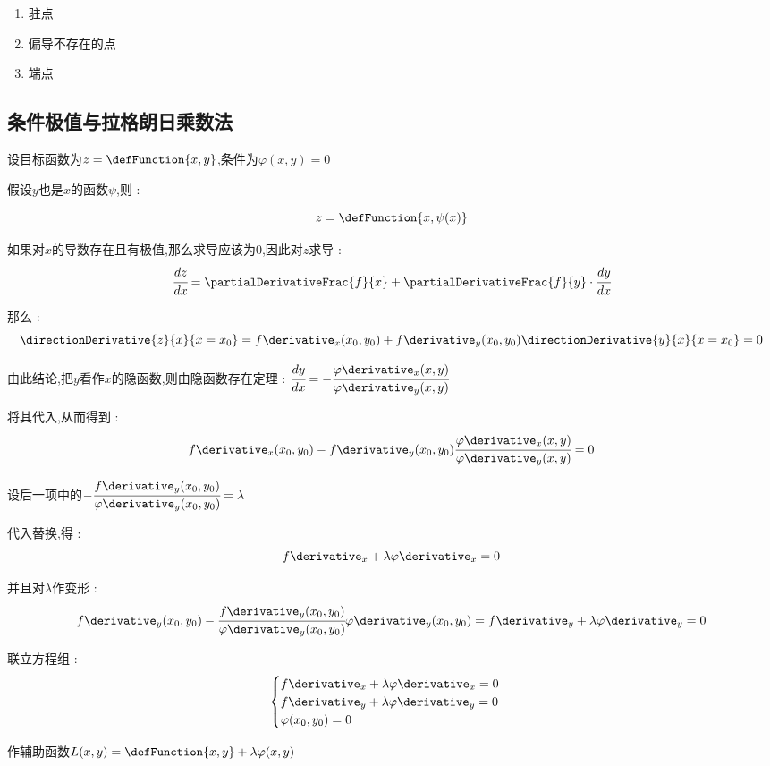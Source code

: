 {{{    \begin{enumerate}
      \item 驻点
      \item 偏导不存在的点
      \item 端点
    \end{enumerate}
  }%

  \subsection{条件极值与拉格朗日乘数法}{
    设目标函数为$z = \defFunction{x,y}$,条件为$\varphi(x,y) = 0$

    假设$y$也是$x$的函数$\psi$,则 :

    $$
      z = \defFunction{x,\psi(x)}
    $$

    如果对$x$的导数存在且有极值,那么求导应该为$0$,因此对$z$求导 :
    $$
      \cfrac{dz}{dx} = \partialDerivativeFrac{f}{x} + \partialDerivativeFrac{f}{y}\cdot\cfrac{dy}{dx}
    $$

    那么 :
    $$
      \directionDerivative{z}{x}{x = x_0} = f\derivative_x(x_0,y_0) + f\derivative_y(x_0,y_0)\directionDerivative{y}{x}{x = x_0} = 0
    $$

    由此结论,把$y$看作$x$的隐函数,则由隐函数存在定理 : $\cfrac{dy}{dx} = -\cfrac{\varphi\derivative_x(x,y)}{\varphi\derivative_y(x,y)}$

    将其代入,从而得到 :
    $$
      f\derivative_x(x_0,y_0) - f\derivative_y(x_0,y_0)\cfrac{\varphi\derivative_x(x,y)}{\varphi\derivative_y(x,y)} = 0
    $$

    设后一项中的$-\cfrac{f\derivative_y(x_0,y_0)}{\varphi\derivative_y(x_0,y_0)} = \lambda$

    代入替换,得 :
    $$
      f\derivative_x + \lambda\varphi\derivative_x = 0
    $$

    并且对$\lambda$作变形 :
    $$
      f\derivative_y(x_0,y_0) - \cfrac{f\derivative_y(x_0,y_0)}{\varphi\derivative_y(x_0,y_0)}\varphi\derivative_y(x_0,y_0) = f\derivative_y + \lambda\varphi\derivative_y = 0
    $$

    联立方程组 :
    $$
      \begin{cases}
        f\derivative_x + \lambda\varphi\derivative_x = 0 \\
        f\derivative_y + \lambda\varphi\derivative_y = 0 \\
        \varphi(x_0,y_0) = 0
      \end{cases}
    $$

    作辅助函数$L(x,y) = \defFunction{x,y} + \lambda\varphi(x,y)$

}}}
